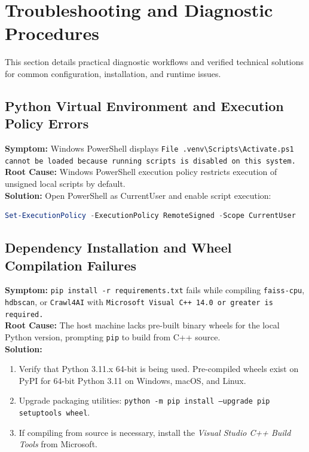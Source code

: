 \section{Troubleshooting and Diagnostic Procedures}
\label{sec:troubleshooting}

This section details practical diagnostic workflows and verified technical solutions for common configuration, installation, and runtime issues.

\subsection{Python Virtual Environment and Execution Policy Errors}
\textbf{Symptom:} Windows PowerShell displays \texttt{File .venv\textbackslash Scripts\textbackslash Activate.ps1 cannot be loaded because running scripts is disabled on this system.}\\
\textbf{Root Cause:} Windows PowerShell execution policy restricts execution of unsigned local scripts by default.\\
\textbf{Solution:} Open PowerShell as CurrentUser and enable script execution:
\begin{lstlisting}[language=powershell]
Set-ExecutionPolicy -ExecutionPolicy RemoteSigned -Scope CurrentUser
\end{lstlisting}

\subsection{Dependency Installation and Wheel Compilation Failures}
\textbf{Symptom:} \texttt{pip install -r requirements.txt} fails while compiling \texttt{faiss-cpu}, \texttt{hdbscan}, or \texttt{Crawl4AI} with \texttt{Microsoft Visual C++ 14.0 or greater is required.}\\
\textbf{Root Cause:} The host machine lacks pre-built binary wheels for the local Python version, prompting \texttt{pip} to build from C++ source.\\
\textbf{Solution:} 
\begin{enumerate}
    \item Verify that Python 3.11.x 64-bit is being used. Pre-compiled wheels exist on PyPI for 64-bit Python 3.11 on Windows, macOS, and Linux.
    \item Upgrade packaging utilities: \texttt{python -m pip install --upgrade pip setuptools wheel}.
    \item If compiling from source is necessary, install the \textit{Visual Studio C++ Build Tools} from Microsoft.
\end{enumerate}

